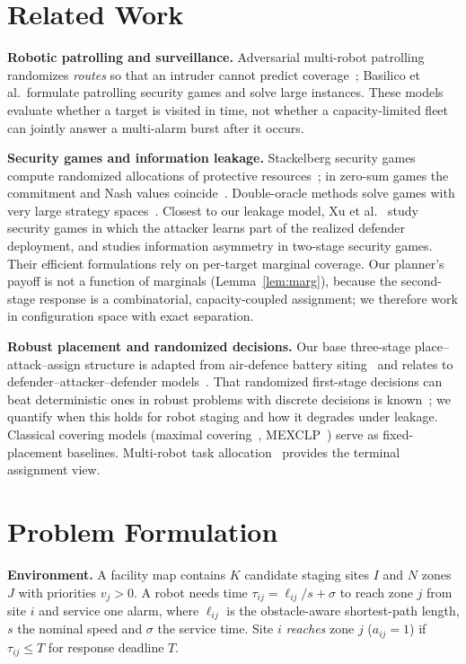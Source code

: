\documentclass[10pt,twocolumn,letterpaper]{article}
\theoremstyle{remark}
\begin{document}
\section{Related Work}
\textbf{Robotic patrolling and surveillance.} Adversarial multi-robot patrolling randomizes \emph{routes} so that an intruder cannot predict coverage~\cite{agmon2008,basilico2012}; Basilico et al.\ formulate patrolling security games and solve large instances. These models evaluate whether a target is visited in time, not whether a capacity-limited fleet can jointly answer a multi-alarm burst after it occurs.

\textbf{Security games and information leakage.} Stackelberg security games compute randomized allocations of protective resources~\cite{tambe2011,kiekintveld2009}; in zero-sum games the commitment and Nash values coincide~\cite{korzhyk2011}. Double-oracle methods solve games with very large strategy spaces~\cite{mcmahan2003,jain2011}. Closest to our leakage model, Xu et al.~\cite{xu2015leak} study security games in which the attacker learns part of the realized defender deployment, and \cite{xu2015asym} studies information asymmetry in two-stage security games. Their efficient formulations rely on per-target marginal coverage. Our planner's payoff is not a function of marginals (Lemma~\ref{lem:marg}), because the second-stage response is a combinatorial, capacity-coupled assignment; we therefore work in configuration space with exact separation.

\textbf{Robust placement and randomized decisions.} Our base three-stage place--attack--assign structure is adapted from air-defence battery siting~\cite{han2016,boardman2017} and relates to defender--attacker--defender models~\cite{brown2006}. That randomized first-stage decisions can beat deterministic ones in robust problems with discrete decisions is known~\cite{delage2019}; we quantify when this holds for robot staging and how it degrades under leakage. Classical covering models (maximal covering~\cite{church1974}, MEXCLP~\cite{daskin1983}) serve as fixed-placement baselines. Multi-robot task allocation~\cite{gerkey2004} provides the terminal assignment view.

\section{Problem Formulation}\label{sec:model}
\textbf{Environment.} A facility map contains $K$ candidate staging sites $I$ and $N$ zones $J$ with priorities $v_j>0$. A robot needs time $\tau_{ij}=\ell_{ij}/s+\sigma$ to reach zone $j$ from site $i$ and service one alarm, where $\ell_{ij}$ is the obstacle-aware shortest-path length, $s$ the nominal speed and $\sigma$ the service time. Site $i$ \emph{reaches} zone $j$ ($a_{ij}=1$) if $\tau_{ij}\le T$ for response deadline $T$.
\end{document}
